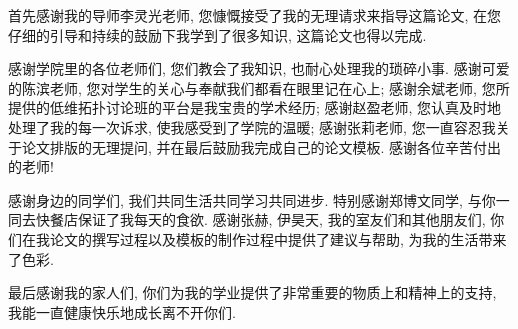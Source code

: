 
\begin{acknowledgements}
  首先感谢我的导师李灵光老师, 您慷慨接受了我的无理请求来指导这篇论文, 在您仔细的引导和持续的鼓励下我学到了很多知识, 这篇论文也得以完成.

  感谢学院里的各位老师们, 您们教会了我知识, 也耐心处理我的琐碎小事. 感谢可爱的陈滨老师, 您对学生的关心与奉献我们都看在眼里记在心上; 感谢余斌老师, 您所提供的低维拓扑讨论班的平台是我宝贵的学术经历; 感谢赵盈老师, 您认真及时地处理了我的每一次诉求, 使我感受到了学院的温暖; 感谢张莉老师, 您一直容忍我关于论文排版的无理提问, 并在最后鼓励我完成自己的论文模板. 感谢各位辛苦付出的老师!

  感谢身边的同学们, 我们共同生活共同学习共同进步. 特别感谢郑博文同学, 与你一同去快餐店保证了我每天的食欲. 感谢张赫, 伊昊天, 我的室友们和其他朋友们, 你们在我论文的撰写过程以及模板的制作过程中提供了建议与帮助, 为我的生活带来了色彩.

  最后感谢我的家人们, 你们为我的学业提供了非常重要的物质上和精神上的支持, 我能一直健康快乐地成长离不开你们.
%
\end{acknowledgements}

